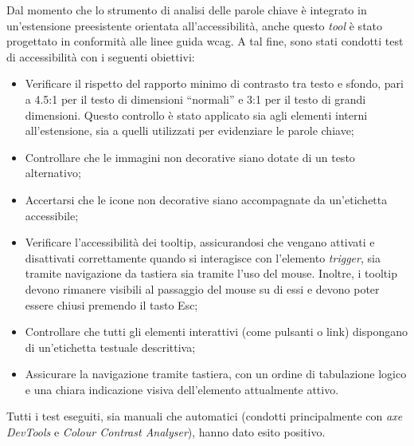 Dal momento che lo strumento di analisi delle parole chiave è integrato in un’estensione preesistente orientata all’accessibilità, anche questo \textit{tool} è stato progettato in conformità alle linee guida \gls{wcag}. A tal fine, sono stati condotti test di accessibilità con i seguenti obiettivi:
\begin{itemize}
  \item Verificare il rispetto del rapporto minimo di contrasto tra testo e sfondo, pari a 4.5:1 per il testo di dimensioni “normali” e 3:1 per il testo di grandi dimensioni. Questo controllo è stato applicato sia agli elementi interni all’estensione, sia a quelli utilizzati per evidenziare le parole chiave;
  \item Controllare che le immagini non decorative siano dotate di un testo alternativo;
  \item Accertarsi che le icone non decorative siano accompagnate da un’etichetta accessibile;
  \item Verificare l’accessibilità dei tooltip, assicurandosi che vengano attivati e disattivati correttamente quando si interagisce con l’elemento \textit{trigger}, sia tramite navigazione da tastiera sia tramite l’uso del mouse. Inoltre, i tooltip devono rimanere visibili al passaggio del mouse su di essi e devono poter essere chiusi premendo il tasto Esc;
  \item Controllare che tutti gli elementi interattivi (come pulsanti o link) dispongano di un’etichetta testuale descrittiva;
  \item Assicurare la navigazione tramite tastiera, con un ordine di tabulazione logico e una chiara indicazione visiva dell’elemento attualmente attivo.
\end{itemize}

\vspace{15pt}
\noindent Tutti i test eseguiti, sia manuali che automatici (condotti principalmente con \textit{axe DevTools} e \textit{Colour Contrast Analyser}), hanno dato esito positivo.
